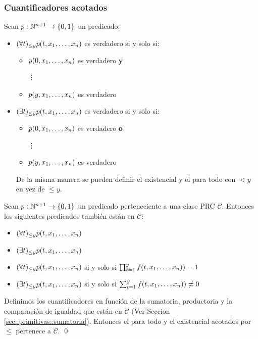 \subsubsection{Cuantificadores acotados}
Sean $p:\mathbb{N}^{n+1}\to\{0,1\}$ un predicado:
\begin{itemize}
	\item[] $(\forall t)_{\leq y} p(t,x_1,\dots, x_{n})$ es verdadero si y solo si:
	\begin{itemize}
		\item $p(0, x_1,\dots, x_{n})$ es verdadero \textbf{y}
		
		\hspace*{1cm}\vdots
		
		\item $p(y, x_1,\dots, x_{n})$ es verdadero 
	\end{itemize}
\item[] $(\exists t)_{\leq y} p(t,x_1,\dots, x_{n})$ es verdadero si y solo si:
\begin{itemize}
	\item $p(0, x_1,\dots, x_{n})$ es verdadero \textbf{o}
	
	\hspace*{1cm}\vdots
	
	\item $p(y, x_1,\dots, x_{n})$ es verdadero 
\end{itemize}
De la misma manera se pueden definir el existencial y el para todo con $< y$ en vez de $\leq y$.
\end{itemize}

\begin{teorema}\label{teorema::cuantificadoresEstanEnPRC}
 Sean $p:\mathbb{N}^{n+1}\to\{0,1\}$ un predicado perteneciente a una clase PRC $\mathcal{C}$. Entonces los siguientes predicados también están en $\mathcal{C}$:

\begin{itemize}
	\item[] $(\forall t)_{\leq y} p(t,x_1,\dots, x_{n})$ 
	\item[] $(\exists t)_{\leq y} p(t,x_1,\dots, x_{n})$
\end{itemize}
\end{teorema}

\begin{demo}
\begin{itemize}
	\item[] $(\forall t)_{\leq y} p(t,x_1,\dots, x_{n})$ si y solo si $\prod_{t=1}^{y} f(t,x_1,\dots, x_{n})) = 1$
	\item[] $(\exists t)_{\leq y} p(t,x_1,\dots, x_{n})$ si y solo si $\sum_{t=1}^{y} f(t,x_1,\dots, x_{n})) \neq 0$
\end{itemize}

\vspace*{5mm}
Definimos los cuantificadores en función de la sumatoria, productoria y la comparación de igualdad que están en $\mathcal{C}$ (Ver Seccion \ref{sec::primitivas::sumatoria}). Entonces el para todo y el existencial acotados por $\leq$ pertenece a $\mathcal{C}$. \qed
\end{demo}

